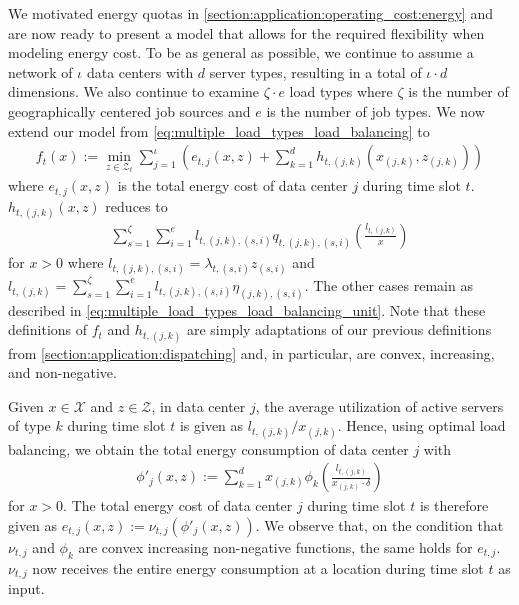We motivated energy quotas in \cref{section:application:operating_cost:energy} and are now ready to present a model that allows for the required flexibility when modeling energy cost. To be as general as possible, we continue to assume a network of $\iota$ data centers with $d$ server types, resulting in a total of $\iota \cdot d$ dimensions. We also continue to examine $\zeta \cdot e$ load types where $\zeta$ is the number of geographically centered job sources and $e$ is the number of job types. We now extend our model from \cref{eq:multiple_load_types_load_balancing} to \begin{align*}
    f_t(x) := \min_{z \in \mathcal{Z}_t} \sum_{j=1}^{\iota} \left(e_{t,j}(x,z) + \sum_{k=1}^{d} h_{t,(j,k)}(x_{(j,k)},z_{(j,k)})\right)
\end{align*} where $e_{t,j}(x,z)$ is the total energy cost of data center $j$ during time slot $t$. $h_{t,(j,k)}(x,z)$ reduces to \begin{align*}
    \sum_{s=1}^{\zeta} \sum_{i=1}^e l_{t,(j,k),(s,i)} q_{t,(j,k),(s,i)}\left(\frac{l_{t,(j,k)}}{x}\right)
\end{align*} for $x > 0$ where $l_{t,(j,k),(s,i)} = \lambda_{t,(s,i)} z_{(s,i)}$ and $l_{t,(j,k)} = \sum_{s=1}^{\zeta} \sum_{i=1}^e l_{t,(j,k),(s,i)} \eta_{(j,k),(s,i)}$. The other cases remain as described in \cref{eq:multiple_load_types_load_balancing_unit}. Note that these definitions of $f_t$ and $h_{t,(j,k)}$ are simply adaptations of our previous definitions from \cref{section:application:dispatching} and, in particular, are convex, increasing, and non-negative.

Given $x \in \mathcal{X}$ and $z \in \mathcal{Z}$, in data center $j$, the average utilization of active servers of type $k$ during time slot $t$ is given as $l_{t,(j,k)} / x_{(j,k)}$. Hence, using optimal load balancing, we obtain the total energy consumption of data center $j$ with \begin{align*}
    \phi'_j(x,z) := \sum_{k=1}^{d} x_{(j,k)} \phi_{k}\left(\frac{l_{t,(j,k)}}{x_{(j,k)} \cdot \delta}\right)
\end{align*} for $x > 0$. The total energy cost of data center $j$ during time slot $t$ is therefore given as $e_{t,j}(x,z) := \nu_{t,j}(\phi'_j(x,z))$. We observe that, on the condition that $\nu_{t,j}$ and $\phi_k$ are convex increasing non-negative functions, the same holds for $e_{t,j}$. $\nu_{t,j}$ now receives the entire energy consumption at a location during time slot $t$ as input.

